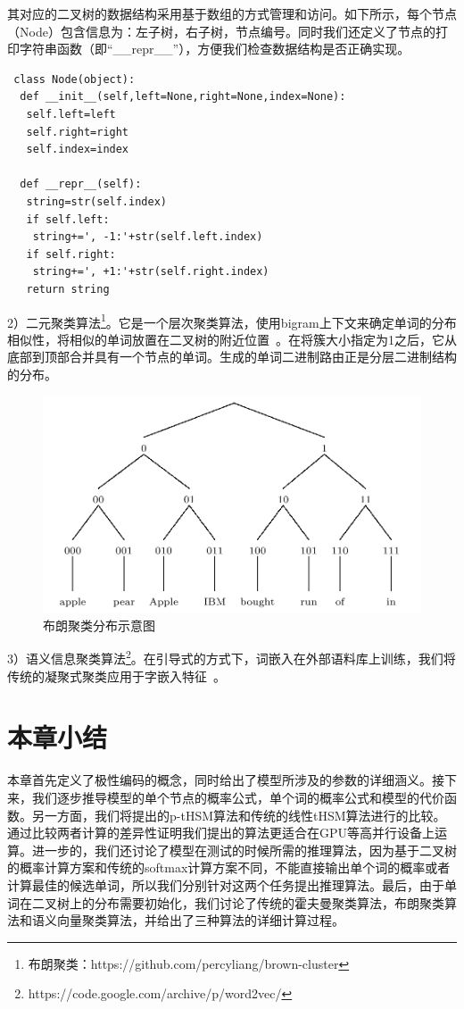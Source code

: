 其对应的二叉树的数据结构采用基于数组的方式管理和访问。如下所示，每个节点（Node）包含信息为：左子树，右子树，节点编号。同时我们还定义了节点的打印字符串函数（即``\_\_repr\_\_''），方便我们检查数据结构是否正确实现。
\begin{verbatim}
 class Node(object):
  def __init__(self,left=None,right=None,index=None):
   self.left=left
   self.right=right
   self.index=index

  def __repr__(self):
   string=str(self.index)
   if self.left:
    string+=', -1:'+str(self.left.index)
   if self.right:
    string+=', +1:'+str(self.right.index)
   return string
\end{verbatim}


2）二元聚类算法\footnote{布朗聚类：https://github.com/percyliang/brown-cluster}。它是一个层次聚类算法，使用bigram上下文来确定单词的分布相似性，将相似的单词放置在二叉树的附近位置~。在将簇大小指定为1之后，它从底部到顶部合并具有一个节点的单词。生成的单词二进制路由正是分层二进制结构的分布。
\begin{figure}[!ht]
  \centering
\includegraphics[width=1\linewidth]{./figures/brown.png}
\caption{布朗聚类分布示意图}\label{fig:brown}
\end{figure}

3）语义信息聚类算法\footnote{https://code.google.com/archive/p/word2vec/}。在引导式的方式下，词嵌入在外部语料库上训练，我们将传统的凝聚式聚类应用于字嵌入特征~。


\section{本章小结}
本章首先定义了极性编码的概念，同时给出了模型所涉及的参数的详细涵义。接下来，我们逐步推导模型的单个节点的概率公式，单个词的概率公式和模型的代价函数。另一方面，我们将提出的p-tHSM算法和传统的线性tHSM算法进行的比较。通过比较两者计算的差异性证明我们提出的算法更适合在GPU等高并行设备上运算。进一步的，我们还讨论了模型在测试的时候所需的推理算法，因为基于二叉树的概率计算方案和传统的softmax计算方案不同，不能直接输出单个词的概率或者计算最佳的候选单词，所以我们分别针对这两个任务提出推理算法。最后，由于单词在二叉树上的分布需要初始化，我们讨论了传统的霍夫曼聚类算法，布朗聚类算法和语义向量聚类算法，并给出了三种算法的详细计算过程。

